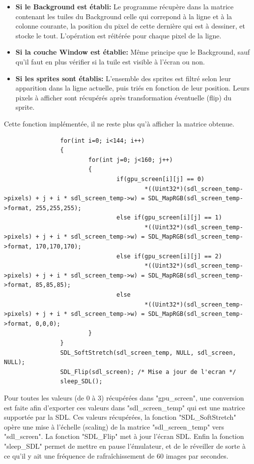 \documentclass{report}
\begin{document}
\begin{itemize}
\item \textbf{Si le Background est établi:}
	Le programme récupère dans la matrice contenant les tuiles du Background celle qui correpond à la ligne et à la colonne courante, la position du pixel de cette dernière qui est à dessiner, et stocke le tout. L'opération est réitérée pour chaque pixel de la ligne.

\item \textbf{Si la couche Window est établie:}
	Même principe que le Background, sauf qu'il faut en plus vérifier si la tuile est visible à l'écran ou non.\\
\item \textbf{Si les sprites sont établis:}
	L'ensemble des sprites est filtré selon leur apparition dans la ligne actuelle, puis triés en fonction de leur position. 
	Leurs pixels à afficher sont récupérés après transformation éventuelle (flip) du sprite.
\end{itemize}

Cette fonction implémentée, il ne reste plus qu'à afficher la matrice obtenue. 

\begin{lstlisting}
                for(int i=0; i<144; i++)
                {
                        for(int j=0; j<160; j++)
                        {
                                if(gpu_screen[i][j] == 0)
                                        *((Uint32*)(sdl_screen_temp->pixels) + j + i * sdl_screen_temp->w) = SDL_MapRGB(sdl_screen_temp->format, 255,255,255);
                                else if(gpu_screen[i][j] == 1)
                                        *((Uint32*)(sdl_screen_temp->pixels) + j + i * sdl_screen_temp->w) = SDL_MapRGB(sdl_screen_temp->format, 170,170,170);
                                else if(gpu_screen[i][j] == 2)
                                        *((Uint32*)(sdl_screen_temp->pixels) + j + i * sdl_screen_temp->w) = SDL_MapRGB(sdl_screen_temp->format, 85,85,85);
                                else
                                        *((Uint32*)(sdl_screen_temp->pixels) + j + i * sdl_screen_temp->w) = SDL_MapRGB(sdl_screen_temp->format, 0,0,0);
                        }
                }
                SDL_SoftStretch(sdl_screen_temp, NULL, sdl_screen, NULL);
                SDL_Flip(sdl_screen); /* Mise a jour de l'ecran */
                sleep_SDL();
\end{lstlisting}
Pour toutes les valeurs (de 0 à 3) récupérées dans "gpu\_screen", une conversion est faite afin d'exporter ces valeurs dans "sdl\_screen\_temp" qui est une matrice supportée par la SDL. Ces valeurs récupérées, la fonction "SDL\_SoftStretch" opère une mise à l'échelle (scaling) de la matrice "sdl\_screen\_temp" vers "sdl\_screen". La fonction "SDL\_Flip" met à jour l'écran SDL. Enfin la fonction "sleep\_SDL" permet de mettre en pause l'émulateur, et de le réveiller de sorte à ce qu'il y ait une fréquence de rafraîchissement de 60 images par secondes.
\end{document}

